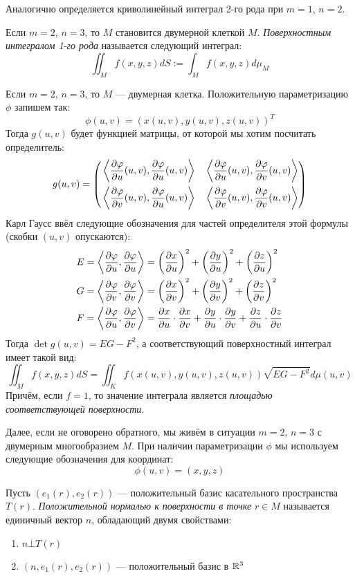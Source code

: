 \begin{note}
	Аналогично определяется криволинейный интеграл 2-го рода при $m = 1$, $n = 2$.
\end{note}

\begin{definition}
	Если $m = 2$, $n = 3$, то $M$ становится двумерной клеткой $M$. \textit{Поверхностным интегралом 1-го рода} называется следующий интеграл:
	\[
		\iint_M f(x, y, z)dS := \int_M f(x, y, z)d\mu_M
	\]
\end{definition}

\begin{note}
	Если $m = 2$, $n = 3$, то $M$ --- двумерная клетка. Положительную параметризацию $\phi$ запишем так:
	\[
		\phi(u, v) = (x(u, v), y(u, v), z(u, v))^T
	\]
	Тогда $g(u, v)$ будет функцией матрицы, от которой мы хотим посчитать определитель:
	\[
		g(u, v) = \left( \begin{aligned} 
			&\left\langle\frac{\partial \varphi}{\partial u}(u, v), \frac{\partial \varphi}{\partial u}(u, v)\right\rangle& &\left\langle\frac{\partial \varphi}{\partial u}(u, v), \frac{\partial \varphi}{\partial v}(u, v)\right\rangle
			\\
			&\left\langle\frac{\partial \varphi}{\partial v}(u, v), \frac{\partial \varphi}{\partial u}(u, v)\right\rangle& &\left\langle\frac{\partial \varphi}{\partial v}(u, v), \frac{\partial \varphi}{\partial v}(u, v)\right\rangle
		 \end{aligned} \right)
	\]
	Карл Гаусс ввёл следующие обозначения для частей определителя этой формулы (скобки $(u, v)$ опускаются):
	\begin{align*}
		&{E = \left\langle\frac{\partial \varphi}{\partial u}, \frac{\partial \varphi}{\partial u}\right\rangle = \left(\frac{\partial x}{\partial u}\right)^2 + \left(\frac{\partial y}{\partial u}\right)^2 + \left(\frac{\partial z}{\partial u}\right)^2}
		\\
		&{G = \left\langle\frac{\partial \varphi}{\partial v}, \frac{\partial \varphi}{\partial v}\right\rangle = \left(\frac{\partial x}{\partial v}\right)^2 + \left(\frac{\partial y}{\partial v}\right)^2 + \left(\frac{\partial z}{\partial v}\right)^2}
		\\
		&{F = \left\langle\frac{\partial \varphi}{\partial u}, \frac{\partial \varphi}{\partial v}\right\rangle = \frac{\partial x}{\partial u} \cdot \frac{\partial x}{\partial v} + \frac{\partial y}{\partial u} \cdot \frac{\partial y}{\partial v} + \frac{\partial z}{\partial u} \cdot \frac{\partial z}{\partial v}}
	\end{align*}
	Тогда $\det g(u, v) = EG - F^2$, а соответствующий поверхностный интеграл имеет такой вид:
	\[
		\iint_M f(x, y, z)dS = \iint_K f(x(u, v), y(u, v), z(u, v))\sqrt{EG - F^2}d\mu(u, v)
	\]
	Причём, если $f = 1$, то значение интеграла является \textit{площадью соответствующей поверхности}.
\end{note}

\begin{note}
	Далее, если не оговорено обратного, мы живём в ситуации $m = 2$, $n = 3$ с двумерным многообразием $M$. При наличии параметризации $\phi$ мы используем следующие обозначения для координат:
	\[
		\phi(u, v) = (x, y, z)
	\]
\end{note}

\begin{definition}
	Пусть $(e_1(r), e_2(r))$ --- положительный базис касательного пространства $T(r)$. \textit{Положительной нормалью к поверхности в точке} $r \in M$ называется единичный вектор $n$, обладающий двумя свойствами:
	\begin{enumerate}
		\item $n \bot T(r)$
		
		\item $(n, e_1(r), e_2(r))$ --- положительный базис в $\mathbb{R}^3$
	\end{enumerate}
\end{definition}

